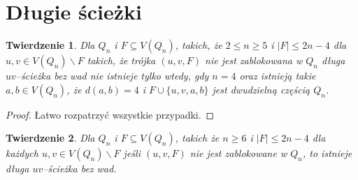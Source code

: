 \documentclass{pracamgr}
\newtheorem{theorem}{Twierdzenie}
\begin{document}
  \section{Długie ścieżki}
   \begin{theorem}\label{tw o dlugich sciezkach, male n}
    Dla $Q_n$ i $F\subseteq V(Q_n)$, takich, że $2\le n \ge 5$ i $|F|\le 2n-4$ dla $u,v\in V(Q_n)\backslash F$ takich, że trójka $(u,v,F)$
    nie jest zablokowana  w $Q_n$ długa $uv$--ścieżka bez wad nie istnieje tylko wtedy, gdy $n=4$ oraz istnieją takie $a,b\in V(Q_n)$,
    że $d(a,b)=4$  i $F\cup\{u,v,a,b\}$  jest dwudzielną częścią $Q_n$.
   \end{theorem}
   \begin{proof}%
    Łatwo rozpatrzyć wszystkie przypadki.
   \end{proof}
   \begin{theorem}\label{tw o dlugich sciezkach}
    Dla $Q_n$ i $F\subseteq V(Q_n)$, takich  że  $n\ge 6$ i $|F|\le 2n-4$ dla każdych $u,v\in V(Q_n)\backslash F$ jeśli $(u,v,F)$ nie jest zablokowane w $Q_n$,
    to istnieje długa $uv$--ścieżka bez wad.
   \end{theorem}
\end{document}
